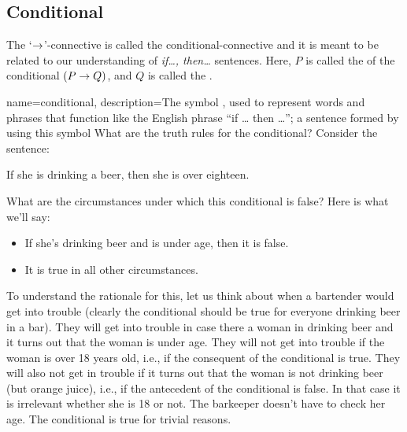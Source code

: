 \subsection{Conditional}
The `$\rightarrow$'-connective is called the conditional-connective and it is meant to be related to our understanding of \emph{if\ldots, then\ldots} sentences. Here, $P$ is called the  of the conditional $(P \rightarrow Q)$, and $Q$ is called the .




{
name=conditional,
description={The symbol \eif, used to represent words and phrases that function like the English phrase ``if \ldots{} then \ldots''; a sentence formed by using this symbol}
}
What are the truth rules for the conditional? Consider the sentence:
\begin{earg}
\item[\ex{bartender}] If she is drinking a beer, then she is over eighteen.
\end{earg}
What are the circumstances under which this conditional is false?
Here is what we'll say:
\begin{itemize}
\item If she's drinking beer and is under age, then it is false.
\item It is true in all other circumstances.
\end{itemize}
To understand the rationale for this, let us think about when a bartender would get into trouble (clearly the conditional should be true for everyone drinking beer in a bar). They will get into trouble in case there a woman in drinking beer and it turns out that the woman is under age. They will not get into trouble if the woman is over 18 years old, i.e., if the consequent of the conditional is true. They will also not get in trouble if it turns out that the woman is not drinking beer (but orange juice), i.e., if the antecedent of the conditional is false.  In that case it is irrelevant whether she is 18 or not. The barkeeper doesn't have to check her age. The conditional is true for trivial reasons.


